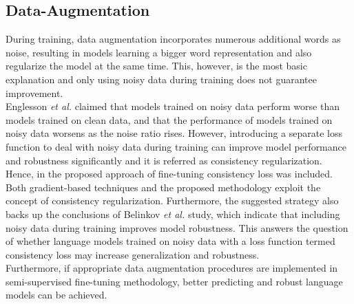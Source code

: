 \documentclass[%
	BCOR=8mm, %
	DIV=12,
	toc=bibliography, %
	toc=listof, %
	oneside, %
	egregdoesnotlikesansseriftitles, %
	]{scrbook}
\begin{document}
\subsection{Data-Augmentation}
During training, data augmentation incorporates numerous additional words as noise, resulting in models learning a bigger word representation and also regularize the model at the same time. This, however, is the most basic explanation and only using noisy data during training does not guarantee improvement. \\
Englesson \textit{et al.} \cite{englesson_consistency_2021} claimed that models trained on noisy data perform worse than models trained on clean data, and that the performance of models trained on noisy data worsens as the noise ratio rises. However, introducing a separate loss function to deal with noisy data during training can improve model performance and robustness significantly and it is referred as consistency regularization.  Hence, in the proposed approach of fine-tuning consistency loss was included.\\
Both gradient-based techniques \cite{miyato_virtual_2018} and the proposed methodology exploit the concept of consistency regularization. Furthermore, the suggested strategy also backs up the conclusions of Belinkov \textit{et al.} \cite{belinkov_synthetic_2018} study, which indicate that including noisy data during training improves model robustness. This answers the question of whether language models trained on noisy data with a loss function termed consistency loss may increase generalization and robustness.\\
 Furthermore, if appropriate data augmentation procedures are implemented in semi-supervised fine-tuning methodology, better predicting and robust language models can be achieved.
\end{document}
